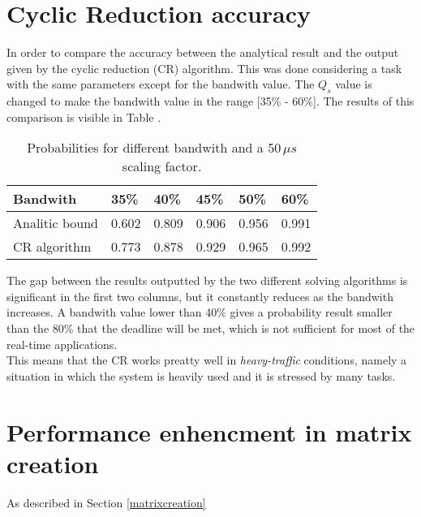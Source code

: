 \section{Cyclic Reduction accuracy} \label{craccuracy}
In order to compare the accuracy between the analytical result and the output given by the cyclic reduction (CR) algorithm. This was done considering a task with the same parameters except for the bandwith value. The \( Q_{s} \) value is changed to make the bandwith value in the range [35\% - 60\%]. The results of this comparison is visible in Table .
\begin{table}[H]
\label{comparison}
\begin{center}
\begin{tabular}{| l | l | l | l | l | l |}
  \hline
  Bandwith & 35\% & 40\% & 45\% & 50\% & 60\% \\ \hline
  Analitic bound & 0.602 & 0.809 & 0.906 & 0.956 & 0.991 \\
  CR algorithm & 0.773 & 0.878 & 0.929 & 0.965 & 0.992 \\ \hline
\end{tabular}
\caption[]{Probabilities for different bandwith and a 50\,\( \mu{s} \) scaling factor\footnotemark.}
\end{center} 
\end{table}


The gap between the results outputted by the two different solving algorithms is significant in the first two columns, but it constantly reduces as the bandwith increases. A bandwith value lower than 40\% gives a probability result smaller than the 80\% that the deadline will be met, which is not sufficient for most of the real-time applications.\\
This means that the CR works preatty well in \emph{heavy-traffic} conditions, namely a situation in which the system is heavily used and it is stressed by many tasks.

\section{Performance enhencment in matrix creation} \label{matrixperformance}
As described in Section \ref{matrixcreation}

